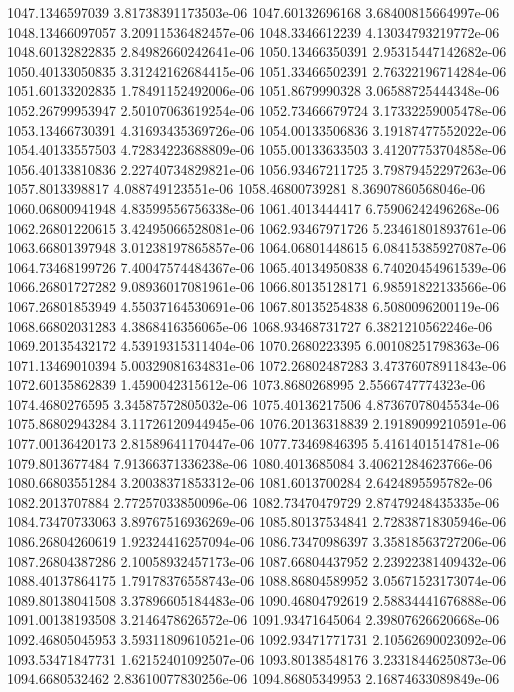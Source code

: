 {1047.1346597039 3.81738391173503e-06
1047.60132696168 3.68400815664997e-06
1048.13466097057 3.20911536482457e-06
1048.3346612239 4.13034793219772e-06
1048.60132822835 2.84982660242641e-06
1050.13466350391 2.95315447142682e-06
1050.40133050835 3.31242162684415e-06
1051.33466502391 2.76322196714284e-06
1051.60133202835 1.78491152492006e-06
1051.8679990328 3.06588725444348e-06
1052.26799953947 2.50107063619254e-06
1052.73466679724 3.17332259005478e-06
1053.13466730391 4.31693435369726e-06
1054.00133506836 3.19187477552022e-06
1054.40133557503 4.72834223688809e-06
1055.00133633503 3.41207753704858e-06
1056.40133810836 2.22740734829821e-06
1056.93467211725 3.79879452297263e-06
1057.8013398817 4.088749123551e-06
1058.46800739281 8.36907860568046e-06
1060.06800941948 4.83599556756338e-06
1061.4013444417 6.75906242496268e-06
1062.26801220615 3.42495066528081e-06
1062.93467971726 5.23461801893761e-06
1063.66801397948 3.01238197865857e-06
1064.06801448615 6.08415385927087e-06
1064.73468199726 7.40047574484367e-06
1065.40134950838 6.74020454961539e-06
1066.26801727282 9.08936017081961e-06
1066.80135128171 6.98591822133566e-06
1067.26801853949 4.55037164530691e-06
1067.80135254838 6.5080096200119e-06
1068.66802031283 4.3868416356065e-06
1068.93468731727 6.3821210562246e-06
1069.20135432172 4.53919315311404e-06
1070.2680223395 6.00108251798363e-06
1071.13469010394 5.00329081634831e-06
1072.26802487283 3.47376078911843e-06
1072.60135862839 1.4590042315612e-06
1073.8680268995 2.5566747774323e-06
1074.4680276595 3.34587572805032e-06
1075.40136217506 4.87367078045534e-06
1075.86802943284 3.11726120944945e-06
1076.20136318839 2.19189099210591e-06
1077.00136420173 2.81589641170447e-06
1077.73469846395 5.4161401514781e-06
1079.8013677484 7.91366371336238e-06
1080.4013685084 3.40621284623766e-06
1080.66803551284 3.20038371853312e-06
1081.6013700284 2.6424895595782e-06
1082.2013707884 2.77257033850096e-06
1082.73470479729 2.87479248435335e-06
1084.73470733063 3.89767516936269e-06
1085.80137534841 2.72838718305946e-06
1086.26804260619 1.92324416257094e-06
1086.73470986397 3.35818563727206e-06
1087.26804387286 2.10058932457173e-06
1087.66804437952 2.23922381409432e-06
1088.40137864175 1.79178376558743e-06
1088.86804589952 3.05671523173074e-06
1089.80138041508 3.37896605184483e-06
1090.46804792619 2.58834441676888e-06
1091.00138193508 3.2146478626572e-06
1091.93471645064 2.39807626620668e-06
1092.46805045953 3.59311809610521e-06
1092.93471771731 2.10562690023092e-06
1093.53471847731 1.62152401092507e-06
1093.80138548176 3.23318446250873e-06
1094.6680532462 2.83610077830256e-06
1094.86805349953 2.16874633089849e-06
}
